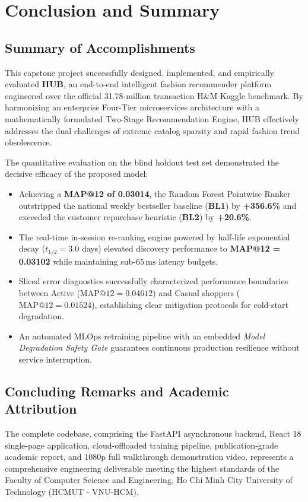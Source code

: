 \section{Conclusion and Summary}

\subsection{Summary of Accomplishments}
This capstone project successfully designed, implemented, and empirically evaluated \textbf{HUB}, an end-to-end intelligent fashion recommender platform engineered over the official 31.78-million transaction H\&M Kaggle benchmark. By harmonizing an enterprise Four-Tier microservices architecture with a mathematically formulated Two-Stage Recommendation Engine, HUB effectively addresses the dual challenges of extreme catalog sparsity and rapid fashion trend obsolescence.

The quantitative evaluation on the blind holdout test set demonstrated the decisive efficacy of the proposed model:
\begin{itemize}
    \item Achieving a \textbf{MAP@12 of 0.03014}, the Random Forest Pointwise Ranker outstripped the national weekly bestseller baseline (\textbf{BL1}) by \textbf{+356.6\%} and exceeded the customer repurchase heuristic (\textbf{BL2}) by \textbf{+20.6\%}.
    \item The real-time in-session re-ranking engine powered by half-life exponential decay ($t_{1/2} = 3.0$ days) elevated discovery performance to \textbf{MAP@12 = 0.03102} while maintaining sub-$65\,\text{ms}$ latency budgets.
    \item Sliced error diagnostics successfully characterized performance boundaries between Active ($\text{MAP}@12 = 0.04612$) and Casual shoppers ($\text{MAP}@12 = 0.01524$), establishing clear mitigation protocols for cold-start degradation.
    \item An automated MLOps retraining pipeline with an embedded \textit{Model Degradation Safety Gate} guarantees continuous production resilience without service interruption.
\end{itemize}

\subsection{Concluding Remarks and Academic Attribution}
The complete codebase, comprising the FastAPI asynchronous backend, React 18 single-page application, cloud-offloaded training pipeline, publication-grade academic report, and 1080p full walkthrough demonstration video, represents a comprehensive engineering deliverable meeting the highest standards of the Faculty of Computer Science and Engineering, Ho Chi Minh City University of Technology (HCMUT - VNU-HCM).

